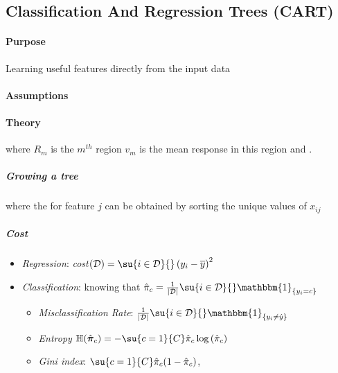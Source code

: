 \subsection{Classification And Regression Trees (CART)}
\paragraph{Purpose}
Learning useful features directly from the input data
\paragraph{Assumptions}
\paragraph{Theory}
\begin{center}
\end{center}
where $R_{m}$ is the $m^{th}$ region $v_{m}$ is the mean response in this region and 
.
\subparagraph{Growing a tree}
\begin{center}
\end{center}
where the  for feature $j$ can be obtained
by sorting the unique values of $x_{ij}$
\subparagraph{Cost}
\begin{itemize}
    \item \emph{Regression}: \emph{cost}$(\mathcal{D})=\su{i\in\mathcal{D}}{}\left(
        y_{i}-\overline{y}\right)^{2}$
    \item \emph{Classification}:  knowing that $\hat{\pi}_{c} = \frac{1}{|\mathcal{D}|}
        \su{i\in\mathcal{D}}{}\mathbbm{1}_{\{y_{i}=c\}}$ 
        \begin{itemize}
            \item \emph{Misclassification Rate}: $\frac{1}{|\mathcal{D}|}\su{i\in
                \mathcal{D}}{}\mathbbm{1}_{\{y_{i}\neq\hat{y}\}}$
            \item \emph{Entropy} $\mathbb{H}(\hat{\bm{\pi}}_{c}) =-\su{c=1}{C}\hat{\pi}
                _{c}\log\left(\hat{\pi}_{c}\right)$
            \item \emph{Gini index}: $\su{c=1}{C}\hat{\pi}_{c} (1-\hat{\pi}_{c})$, 
        \end{itemize}
\end{itemize}
